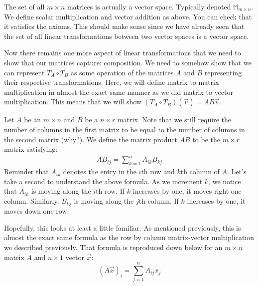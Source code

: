\begin{remark}
    The set of all $m\times n$ matrices is actually a vector space. Typically denoted $\mathbb{M}_{m\times n}$. We define scalar multiplication and vector addition as above. You can check that it satisfies the axioms.
This should make sense since we have already seen that the set of all linear transformations between two vector spaces is a vector space.
\end{remark}

Now there remains one more aspect of linear transformations that we need to show that our matrices capture: composition. We need to somehow show that we can represent $T_A\circ T_B$ as some operation of the matrices $A$ and $B$ representing their respective transformations. Here, we will define matrix to matrix multiplication in almost the exact same manner as we did matrix to vector multiplication. This means that we will show $(T_A\circ T_B)(\vec{v})=AB\vec{v}$.

Let $A$ be an $m\times n$ and $B$ be a $n\times r$ matrix. Note that we still require the number of columns in the first matrix to be equal to the number of columns in the second matrix (why?). We define the matrix product $AB$ to be the $m\times r$ matrix satisfying:
\begin{align}
    AB_{ij}=\sum_{k=1}^nA_{ik}B_{kj}
\end{align}
Reminder that $A_{ik}$ denotes the entry in the $i$th row and $k$th column of $A$. Let's take a second to understand the above formula. As we increment $k$, we notice that $A_{ik}$ is moving along the $i$th row. If $k$ increases by one, it moves right one column. Similarly, $B_{kj}$ is moving along the $j$th column. If $k$ increases by one, it moves down one row.

Hopefully, this looks at least a little familiar. As mentioned previously, this is almost the exact same formula as the row by column matrix-vector multiplication we described previously. That formula is reproduced down below for an $m\times n$ matrix $A$ and $n\times 1$ vector $\vec{x}$:
$$(A\vec{x})_i=\sum_{j=1}^nA_{ij}x_j$$

